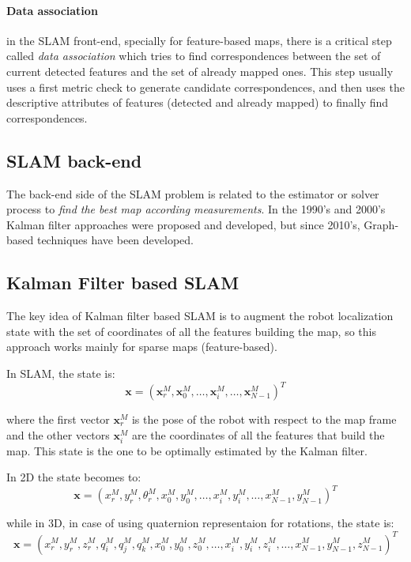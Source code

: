 \paragraph{Data association} in the SLAM front-end, specially for feature-based maps, there is a critical step called \textit{data association} which tries to find correspondences between the set of current detected features and the set of already mapped ones. This step usually uses a first metric check to generate candidate correspondences, and then uses the descriptive attributes of features (detected and already mapped) to finally find correspondences.


\subsection{SLAM back-end}
The back-end side of the SLAM problem is related to the estimator or solver process to \textit{find the best map according measurements}. In the 1990's and 2000's Kalman filter approaches were proposed and developed, but since 2010's, Graph-based techniques have been developed. 

\subsection{Kalman Filter based SLAM}
The key idea of Kalman filter based SLAM is to augment the robot localization state with the set of coordinates of all the features building the map, so this approach works mainly for sparse maps (feature-based).

In SLAM, the state is: 
\begin{equation}
 \mathbf{x} = (\mathbf{x}^M_r,\mathbf{x}^M_0,\dots,\mathbf{x}^M_i,\dots,\mathbf{x}^M_{N-1})^T
\end{equation}

where the first vector $\mathbf{x}^M_r$ is the pose of the robot with respect to the map frame and the other vectors $\mathbf{x}^M_i$ are the coordinates of all the features that build the map. This state is the one to be optimally estimated by the Kalman filter. 

In 2D the state becomes to: 
\begin{equation}
 \mathbf{x} = (x^M_r,y^M_r,\theta^M_r,x^M_0,y^M_0,\dots,x^M_i,y^M_i,\dots,x^M_{N-1},y^M_{N-1})^T
\end{equation}

while in 3D, in case of using quaternion representaion for rotations, the state is: 
\begin{equation}
 \mathbf{x} = (x^M_r,y^M_r,z^M_r,q^M_i,q^M_j,q^M_k,x^M_0,y^M_0,z^M_0,\dots,x^M_i,y^M_i,z^M_i,\dots,x^M_{N-1},y^M_{N-1},z^M_{N-1})^T
\end{equation}

